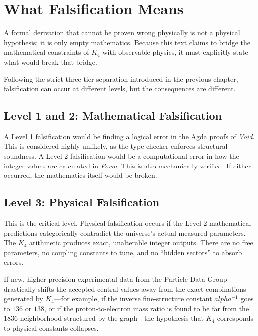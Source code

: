 \documentclass[11pt,a4paper]{book}
\def\alpha{alpha}%
\begin{document}
\chapter{What Falsification Means}
\label{ch:falsification}

A formal derivation that cannot be proven wrong physically is not a physical hypothesis; it is only empty mathematics. Because this text claims to bridge the mathematical constraints of $K_4$ with observable physics, it must explicitly state what would break that bridge.

Following the strict three-tier separation introduced in the previous chapter, falsification can occur at different levels, but the consequences are different.

\section*{Level 1 and 2: Mathematical Falsification}

A Level 1 falsification would be finding a logical error in the Agda proofs of \textit{Void}. This is considered highly unlikely, as the type-checker enforces structural soundness. A Level 2 falsification would be a computational error in how the integer values are calculated in \textit{Form}. This is also mechanically verified. If either occurred, the mathematics itself would be broken. 

\section*{Level 3: Physical Falsification}

This is the critical level. Physical falsification occurs if the Level 2 mathematical predictions categorically contradict the universe's actual measured parameters. The $K_4$ arithmetic produces exact, unalterable integer outputs. There are no free parameters, no coupling constants to tune, and no ``hidden sectors'' to absorb errors. 

If new, higher-precision experimental data from the Particle Data Group drastically shifts the accepted central values away from the exact combinations generated by $K_4$---for example, if the inverse fine-structure constant $\alpha^{-1}$ goes to $136$ or $138$, or if the proton-to-electron mass ratio is found to be far from the $1836$ neighborhood structured by the graph---the hypothesis that $K_4$ corresponds to physical constants collapses.
\end{document}
